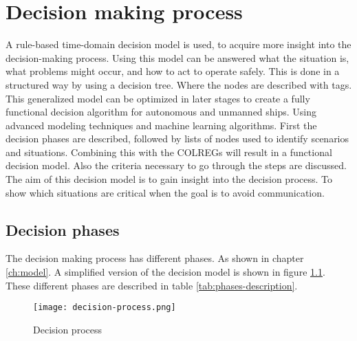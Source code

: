 \chapter{Decision making process}
\label{ch:decision-process}
A rule-based time-domain decision model is used, to acquire more insight into the decision-making process. Using this model can be answered what the situation is, what problems might occur, and how to act to operate safely. This is done in a structured way by using a decision tree. Where the nodes are described with tags. This generalized model can be optimized in later stages to create a fully functional decision algorithm for autonomous and unmanned ships. Using advanced modeling techniques and machine learning algorithms. First the decision phases are described, followed by lists of nodes used to identify scenarios and situations. Combining this with the COLREGs will result in a functional decision model. Also the criteria necessary to go through the steps are discussed. The aim of this decision model is to gain insight into the decision process. To show which situations are critical when the goal is to avoid communication.

\section{Decision phases}
The decision making process has different phases. As shown in chapter \ref{ch:model}. A simplified version of the decision model is shown in figure \ref{fig:decision-process}. These different phases are described in table \ref{tab:phases-description}.

\begin{figure}[hb]
	\centering
	\texttt{[image: decision-process.png]}
	\caption{Decision process}
	\label{fig:decision-process}
\end{figure}

